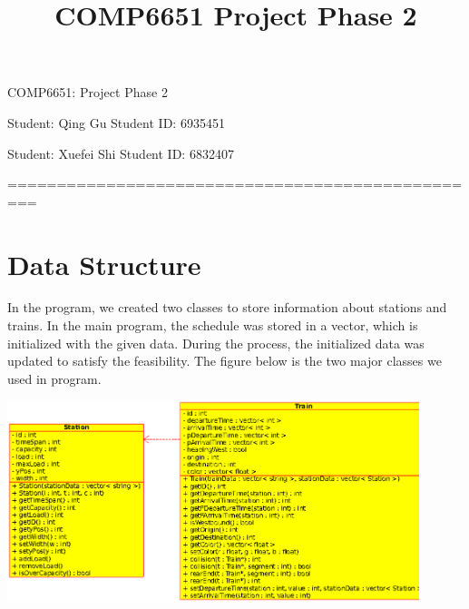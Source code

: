 \documentclass[letterpaper, 12pt, titlepage]{article}
\begin{document}
\title{COMP6651 Project Phase 2}
\setcounter{tocdepth}{2}
\newpage
\begin{center}
    {\huge COMP6651: Project Phase 2}


    \vspace{2cm}
    Student: Qing Gu  \hspace{5cm}
    Student ID: 6935451
   
    Student: Xuefei Shi  \hspace{5cm}
    Student ID: 6832407
\vspace{1cm}
    \vspace{1cm}

    =================================================
\end{center}

\section{Data Structure}
In the program, we created two classes to store information about stations and trains. In the main program, the schedule was stored in a vector, which is initialized with the given data. During the process, the initialized data was updated to satisfy the feasibility. The figure below is the two major classes we used in program.
\begin{center}
    \small
    \centering
    \includegraphics[width=12cm]{class.ps}
    \label{uml}
\end{center}
\end{document}
